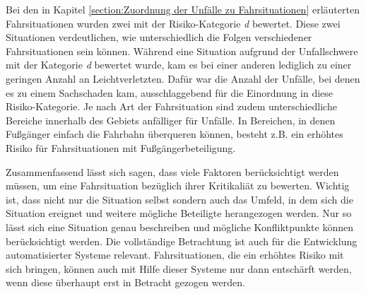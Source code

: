 Bei den in Kapitel \ref{section:Zuordnung der Unfälle zu Fahrsituationen} erläuterten Fahrsituationen wurden zwei mit der Risiko-Kategorie \textit{d} bewertet. Diese zwei Situationen verdeutlichen, wie unterschiedlich die Folgen verschiedener Fahrsituationen sein können. Während eine Situation aufgrund der Unfallschwere mit der Kategorie \textit{d} bewertet wurde, kam es bei einer anderen lediglich zu einer geringen Anzahl an Leichtverletzten. Dafür war die Anzahl der Unfälle, bei denen es zu einem Sachschaden kam, ausschlaggebend für die Einordnung in diese Risiko-Kategorie. Je nach Art der Fahrsituation sind zudem unterschiedliche Bereiche innerhalb des Gebiets anfälliger für Unfälle. In Bereichen, in denen Fußgänger einfach die Fahrbahn überqueren können, besteht z.B. ein erhöhtes Risiko für Fahrsituationen mit Fußgängerbeteiligung.

Zusammenfassend lässt sich sagen, dass viele Faktoren berücksichtigt werden müssen, um eine Fahrsituation bezüglich ihrer Kritikaliät zu bewerten. Wichtig ist, dass nicht nur die Situation selbst sondern auch das Umfeld, in dem sich die Situation ereignet und weitere mögliche Beteiligte herangezogen werden. Nur so lässt sich eine Situation genau beschreiben und mögliche Konfliktpunkte können berücksichtigt werden. Die vollständige Betrachtung ist auch für die Entwicklung automatisierter Systeme relevant. Fahrsituationen, die ein erhöhtes Risiko mit sich bringen, können auch mit Hilfe dieser Systeme nur dann entschärft werden, wenn diese überhaupt erst in Betracht gezogen werden.